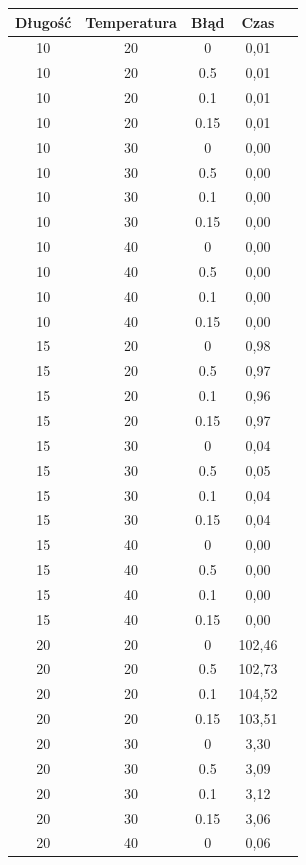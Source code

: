 \documentclass{article}
\begin{document}
\begin{longtable}{c|c|c|c|c}
Długość  & Temperatura  & Błąd & Czas  \\
\hline
10     & 20   & 0     & 0,01   \\
10     & 20   & 0.5   & 0,01   \\
10     & 20   & 0.1   & 0,01   \\
10     & 20   & 0.15  & 0,01   \\
10     & 30   & 0     & 0,00   \\
10     & 30   & 0.5   & 0,00   \\
10     & 30   & 0.1   & 0,00   \\
10     & 30   & 0.15  & 0,00   \\
10     & 40   & 0     & 0,00   \\
10     & 40   & 0.5   & 0,00   \\
10     & 40   & 0.1   & 0,00   \\
10     & 40   & 0.15  & 0,00   \\
15     & 20   & 0     & 0,98   \\
15     & 20   & 0.5   & 0,97   \\
15     & 20   & 0.1   & 0,96   \\
15     & 20   & 0.15  & 0,97   \\
15     & 30   & 0     & 0,04   \\
15     & 30   & 0.5   & 0,05   \\
15     & 30   & 0.1   & 0,04   \\
15     & 30   & 0.15  & 0,04   \\
15     & 40   & 0     & 0,00   \\
15     & 40   & 0.5   & 0,00   \\
15     & 40   & 0.1   & 0,00   \\
15     & 40   & 0.15  & 0,00   \\
20     & 20   & 0     & 102,46 \\
20     & 20   & 0.5   & 102,73 \\
20     & 20   & 0.1   & 104,52 \\
20     & 20   & 0.15  & 103,51 \\
20     & 30   & 0     & 3,30   \\
20     & 30   & 0.5   & 3,09   \\
20     & 30   & 0.1   & 3,12   \\
20     & 30   & 0.15  & 3,06   \\
20     & 40   & 0     & 0,06   \\

\end{longtable}
\end{document}
